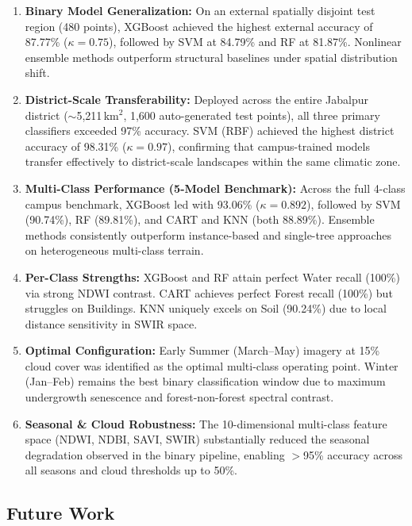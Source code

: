 \documentclass[12pt, a4paper, twocolumn]{article}
\begin{document}
\begin{enumerate}
    \item \textbf{Binary Model Generalization:} On an external spatially disjoint test region (480 points), XGBoost achieved the highest external accuracy of 87.77\% ($\kappa=0.75$), followed by SVM at 84.79\% and RF at 81.87\%.
Nonlinear ensemble methods outperform structural baselines under spatial distribution shift.
    \item \textbf{District-Scale Transferability:} Deployed across the entire Jabalpur district ($\sim$5,211\,km$^2$, 1,600 auto-generated test points), all three primary classifiers exceeded 97\% accuracy.
SVM (RBF) achieved the highest district accuracy of 98.31\% ($\kappa=0.97$), confirming that campus-trained models transfer effectively to district-scale landscapes within the same climatic zone.
    \item \textbf{Multi-Class Performance (5-Model Benchmark):} Across the full 4-class campus benchmark, XGBoost led with 93.06\% ($\kappa=0.892$), followed by SVM (90.74\%), RF (89.81\%), and CART and KNN (both 88.89\%).
Ensemble methods consistently outperform instance-based and single-tree approaches on heterogeneous multi-class terrain.
    \item \textbf{Per-Class Strengths:} XGBoost and RF attain perfect Water recall (100\%) via strong NDWI contrast.
CART achieves perfect Forest recall (100\%) but struggles on Buildings.
KNN uniquely excels on Soil (90.24\%) due to local distance sensitivity in SWIR space.
    \item \textbf{Optimal Configuration:} Early Summer (March--May) imagery at 15\% cloud cover was identified as the optimal multi-class operating point.
Winter (Jan--Feb) remains the best binary classification window due to maximum undergrowth senescence and forest-non-forest spectral contrast.
    \item \textbf{Seasonal \& Cloud Robustness:} The 10-dimensional multi-class feature space (NDWI, NDBI, SAVI, SWIR) substantially reduced the seasonal degradation observed in the binary pipeline, enabling $>$95\% accuracy across all seasons and cloud thresholds up to 50\%.
\end{enumerate}

\subsection{Future Work}
\end{document}
